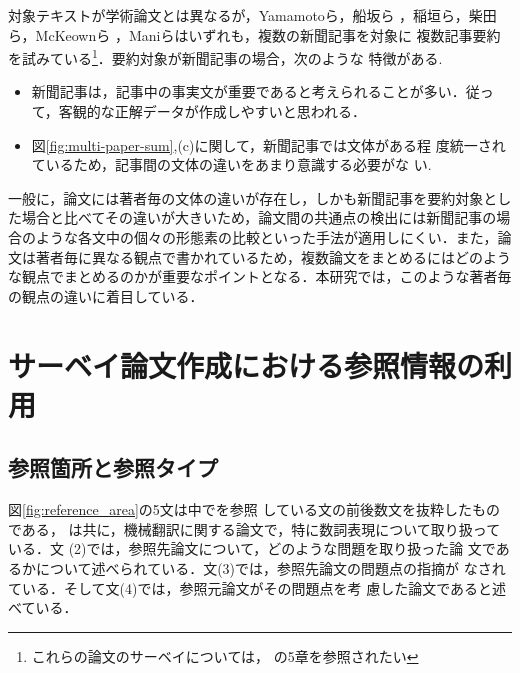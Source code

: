 対象テキストが学術論文とは異なるが，Yamamotoら\cite{Yamamoto95}，船坂ら
\cite{船坂96}，稲垣ら\cite{稲垣98}，柴田ら\cite{柴田97}，McKeownら
\cite{McKeown95}，Maniら\cite{Mani97}はいずれも，複数の新聞記事を対象に
複数記事要約を試みている\footnote{これらの論文のサーベイについては，
\cite{奥村98}の5章を参照されたい}．要約対象が新聞記事の場合，次のような
特徴がある.

\vspace{0.3cm}

\begin{itemize}
 \item 新聞記事は，記事中の事実文が重要であると考えられることが多い．従っ
       て，客観的な正解データが作成しやすいと思われる．
 \item 図\ref{fig:multi-paper-sum},(c)に関して，新聞記事では文体がある程
       度統一されているため，記事間の文体の違いをあまり意識する必要がな
       い.
\end{itemize}

一般に，論文には著者毎の文体の違いが存在し，しかも新聞記事を要約対象とし
た場合と比べてその違いが大きいため，論文間の共通点の検出には新聞記事の場
合のような各文中の個々の形態素の比較といった手法が適用しにくい．また，論
文は著者毎に異なる観点で書かれているため，複数論文をまとめるにはどのよう
な観点でまとめるのかが重要なポイントとなる．本研究では，このような著者毎
の観点の違いに着目している．


\section{サーベイ論文作成における参照情報の利用}

\subsection{参照箇所と参照タイプ}



図\ref{fig:reference_area}の5文は\cite{Bond96a}中で\cite{Murata93}を参照
している文の前後数文を抜粋したものである\cite{Bond96a}，\cite{Murata93}
は共に，機械翻訳に関する論文で，特に数詞表現について取り扱っている．文
(2)では，参照先論文\cite{Murata93}について，どのような問題を取り扱った論
文であるかについて述べられている．文(3)では，参照先論文の問題点の指摘が
なされている．そして文(4)では，参照元論文\cite{Bond96a}がその問題点を考
慮した論文であると述べている．

